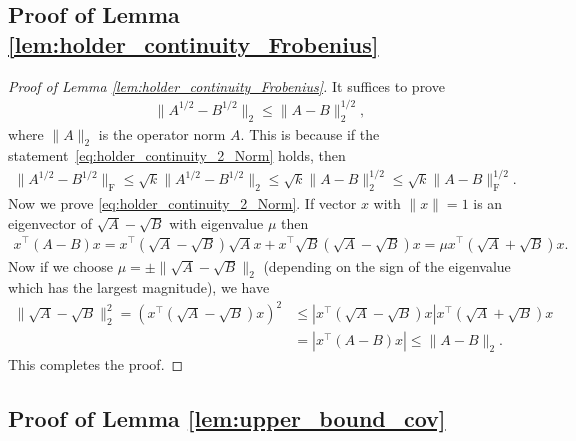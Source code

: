 \documentclass[12pt]{article}
\begin{document}
\subsection{Proof of Lemma \ref{lem:holder_continuity_Frobenius}}

\begin{proof}[Proof of Lemma \ref{lem:holder_continuity_Frobenius}]
	It suffices to prove 
	\begin{align}\label{eq:holder_continuity_2_Norm}
		\|A^{1/2}-B^{1/2}\|_{2}\leq \|A-B\|_{2}^{1/2},
	\end{align}
	where $\|A\|_2$ is the operator norm $A$. This is because if the statement~\eqref{eq:holder_continuity_2_Norm} holds, then
	\begin{align*}
		\|A^{1/2}-B^{1/2}\|_{\mathrm{F}}\leq \sqrt{k}\|A^{1/2}-B^{1/2}\|_{2}\leq \sqrt{k}\|A-B\|_{2}^{1/2}\leq \sqrt{k}\|A-B\|_{\mathrm{F}}^{1/2}.
	\end{align*}
	Now we prove \eqref{eq:holder_continuity_2_Norm}. If vector $x$ with $\|x\|=1$ is an eigenvector of $\sqrt{A}-\sqrt{B}$ with eigenvalue $\mu$ then 
	\begin{align*}
		x^\top (A-B)x=x^\top (\sqrt{A}-\sqrt{B})\sqrt{A}x+x^\top \sqrt{B}(\sqrt{A}-\sqrt{B})x=\mu x^\top (\sqrt{A}+\sqrt{B})x.
	\end{align*}
	Now if we choose $\mu=\pm \|\sqrt{A}-\sqrt{B}\|_2$ (depending on the sign of the eigenvalue which has the largest magnitude), we have
	\begin{align*}
		\|\sqrt{A}-\sqrt{B}\|_2^2=(x^\top (\sqrt{A}-\sqrt{B})x)^2
		&
		\leq |x^\top (\sqrt{A}-\sqrt{B})x|x^\top (\sqrt{A}+\sqrt{B})x\\
		&
		=|x^\top (A-B)x|\leq \|A-B\|_2.
	\end{align*}
	This completes the proof.
\end{proof}


\subsection{Proof of Lemma \ref{lem:upper_bound_cov}}
\end{document}
